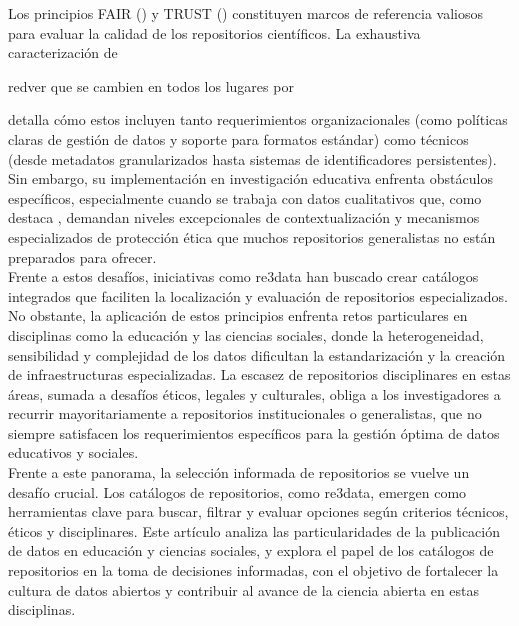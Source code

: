 \documentclass[runningheads]{llncs}
\def \bchregi {\begin{color}{red}}
\def \echregi {\end{color}}
\begin{document}
Los principios FAIR (\cite{wilkinson2016}) y TRUST (\cite{Lin2020TRUST}) constituyen marcos de referencia valiosos para evaluar la calidad de los repositorios científicos. La exhaustiva caracterización de \bchregi ver que se cambien en todos los lugares \cite{Behnke2020FAIRfeatures} por \cite{behnke_2020_5361952} \echregi detalla cómo estos incluyen tanto requerimientos organizacionales (como políticas claras de gestión de datos y soporte para formatos estándar) como técnicos (desde metadatos granularizados hasta sistemas de identificadores persistentes). Sin embargo, su implementación en investigación educativa enfrenta obstáculos específicos, especialmente cuando se trabaja con datos cualitativos que, como  destaca \cite{antonio}, demandan niveles excepcionales de contextualización y mecanismos especializados de protección ética que muchos repositorios generalistas no están preparados para ofrecer.\\

Frente a estos desafíos, iniciativas como re3data \cite{pampel2013} han buscado crear catálogos integrados que faciliten la localización y evaluación de repositorios especializados.\\

No obstante, la aplicación de estos principios enfrenta retos particulares en disciplinas como la educación y las ciencias sociales, donde la heterogeneidad, sensibilidad y complejidad de los datos dificultan la estandarización y la creación de infraestructuras especializadas. La escasez de repositorios disciplinares en estas áreas, sumada a desafíos éticos, legales y culturales, obliga a los investigadores a recurrir mayoritariamente a repositorios institucionales o generalistas, que no siempre satisfacen los requerimientos específicos para la gestión óptima de datos educativos y sociales.\\

Frente a este panorama, la selección informada de repositorios se vuelve un desafío crucial. Los catálogos de repositorios, como re3data, emergen como herramientas clave para buscar, filtrar y evaluar opciones según criterios técnicos, éticos y disciplinares. Este artículo analiza las particularidades de la publicación de datos en educación y ciencias sociales, y explora el papel de los catálogos de repositorios en la toma de decisiones informadas, con el objetivo de fortalecer la cultura de datos abiertos y contribuir al avance de la ciencia abierta en estas disciplinas.\\
\end{document}

